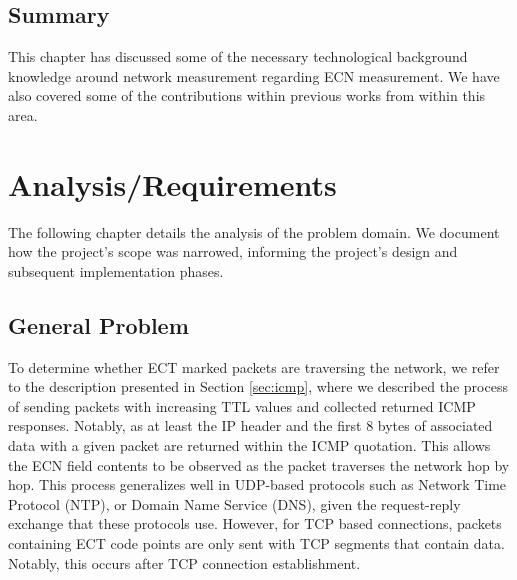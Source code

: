 \documentclass{l4proj}
\begin{document}




\section{Summary}

This chapter has discussed some of the necessary technological background knowledge around network measurement regarding ECN measurement. We have also covered some of the contributions within previous works from within this area.



\chapter{Analysis/Requirements}
\label{chap:analysis}

The following chapter details the analysis of the problem domain. We document how the project's scope was narrowed, informing the project's design and subsequent implementation phases.

\section{General Problem}
\label{sec:general}


To determine whether ECT marked packets are traversing the network, we refer to the description presented in Section \ref{sec:icmp}, where we described the process of sending packets with increasing TTL values and collected returned ICMP responses. Notably, as at least the IP header and the first 8 bytes of associated data with a given packet are returned within the ICMP quotation. This allows the ECN field contents to be observed as the packet traverses the network hop by hop. This process generalizes well in UDP-based protocols such as Network Time Protocol (NTP), or Domain Name Service (DNS), given the request-reply exchange that these protocols use. However, for TCP based connections, packets containing ECT code points are only sent with TCP segments that contain data. Notably, this occurs after TCP connection establishment.
\end{document}
